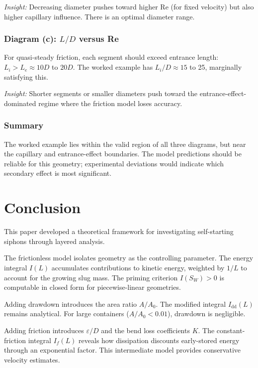 \documentclass[11pt]{article}
\begin{document}
\emph{Insight:} Decreasing diameter pushes toward higher Re (for fixed velocity) but also higher capillary influence. There is an optimal diameter range.

\subsubsection{Diagram (c): $L/D$ versus Re}

For quasi-steady friction, each segment should exceed entrance length: $L_i > L_e \approx 10D$ to $20D$. The worked example has $L_i/D \approx 15$ to 25, marginally satisfying this.

\emph{Insight:} Shorter segments or smaller diameters push toward the entrance-effect-dominated regime where the friction model loses accuracy.

\subsubsection{Summary}

The worked example lies within the valid region of all three diagrams, but near the capillary and entrance-effect boundaries. The model predictions should be reliable for this geometry; experimental deviations would indicate which secondary effect is most significant.

\section{Conclusion}
\label{sec:conclusion}

This paper developed a theoretical framework for investigating self-starting siphons through layered analysis.

The frictionless model isolates geometry as the controlling parameter. The energy integral $I(L)$ accumulates contributions to kinetic energy, weighted by $1/L$ to account for the growing slug mass. The priming criterion $I(S_W) > 0$ is computable in closed form for piecewise-linear geometries.

Adding drawdown introduces the area ratio $A/A_0$. The modified integral $I_{\text{dd}}(L)$ remains analytical. For large containers ($A/A_0 < 0.01$), drawdown is negligible.

Adding friction introduces $\varepsilon/D$ and the bend loss coefficients $K$. The constant-friction integral $I_f(L)$ reveals how dissipation discounts early-stored energy through an exponential factor. This intermediate model provides conservative velocity estimates.
\end{document}
